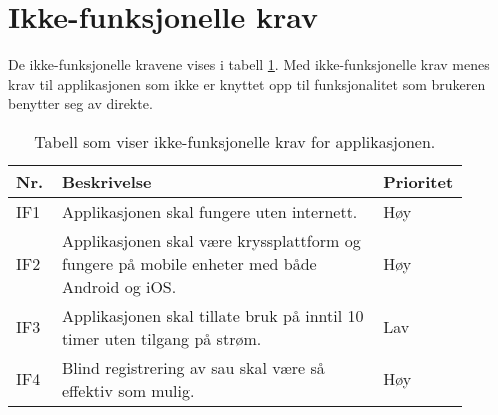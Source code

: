 \section{Ikke-funksjonelle krav}  \label{sec:ikke-funksjonelle-krav}
De ikke-funksjonelle kravene vises i tabell \ref{tbl:ikke-funksjonelle-krav}. Med ikke-funksjonelle krav menes krav til applikasjonen som ikke er knyttet opp til funksjonalitet som brukeren benytter seg av direkte.
\begin{table}[H]
    \centering 
    \begin{tabular}{| p{0.1\linewidth} | p{0.7\linewidth} | p{0.1\linewidth} |}
       \hline
        Nr. & Beskrivelse & Prioritet \\
        \hline \hline
        IF1 & Applikasjonen skal fungere uten internett. & Høy \\ 
        \hline
        IF2 & Applikasjonen skal være kryssplattform og fungere på mobile enheter med både Android og iOS. & Høy \\
        \hline
        IF3 & Applikasjonen skal tillate bruk på inntil 10 timer uten tilgang på strøm. & Lav \\ 
        \hline
        IF4 & Blind registrering av sau skal være så effektiv som mulig. & Høy \\ 
        \hline
    \end{tabular}
    \caption{Tabell som viser ikke-funksjonelle krav for applikasjonen.}
    \label{tbl:ikke-funksjonelle-krav}
\end{table}